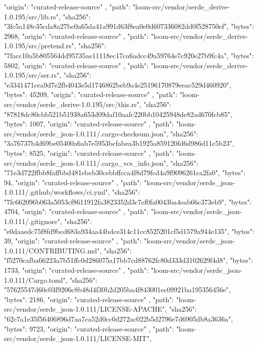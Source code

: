 {{      "origin": "curated-release-source"
    },
    {
      "path": "loom-src/vendor/serde_derive-1.0.195/src/lib.rs",
      "sha256": "3fc5a148c35cda8a27bc0a65da41a991d63f8ea0e0d607336082dd0f528750ef",
      "bytes": 2968,
      "origin": "curated-release-source"
    },
    {
      "path": "loom-src/vendor/serde_derive-1.0.195/src/pretend.rs",
      "sha256": "7facc10a5b805564dd95735ae11118ec17ca6adcc49a59764e7c920e27b9fc4a",
      "bytes": 5802,
      "origin": "curated-release-source"
    },
    {
      "path": "loom-src/vendor/serde_derive-1.0.195/src/ser.rs",
      "sha256": "e3341471cea9d7e2fb4043e5d1746862beb9a4e25196170879eeac529d460920",
      "bytes": 45209,
      "origin": "curated-release-source"
    },
    {
      "path": "loom-src/vendor/serde_derive-1.0.195/src/this.rs",
      "sha256": "87818dc80cbb521b51938a653d09daf10aafc220bb10425948de82ad670fcb85",
      "bytes": 1007,
      "origin": "curated-release-source"
    },
    {
      "path": "loom-src/vendor/serde_json-1.0.111/.cargo-checksum.json",
      "sha256": "3a76737b4d69be05400a6ab7e5953bcfabea3b1925a859120fd6d986d11c5b23",
      "bytes": 8525,
      "origin": "curated-release-source"
    },
    {
      "path": "loom-src/vendor/serde_json-1.0.111/.cargo_vcs_info.json",
      "sha256": "71e3d722ffbb8faffbbd481ebeb30cebbffcca4f8d79fcd4a9f9096261ca2fa0",
      "bytes": 94,
      "origin": "curated-release-source"
    },
    {
      "path": "loom-src/vendor/serde_json-1.0.111/.github/workflows/ci.yml",
      "sha256": "7fc662096b063a5053cf8611912fa3823352d3c7ef0fa0043ba4eab66c373eb9",
      "bytes": 4704,
      "origin": "curated-release-source"
    },
    {
      "path": "loom-src/vendor/serde_json-1.0.111/.gitignore",
      "sha256": "e0daaedc75f8fd9bcd683a934aa44bdce314c11cc8525201cf5d1579a944e135",
      "bytes": 39,
      "origin": "curated-release-source"
    },
    {
      "path": "loom-src/vendor/serde_json-1.0.111/CONTRIBUTING.md",
      "sha256": "f5270cafba66223a7b51ffc0d286075a17bb7cd88762fc80d333d3102629f4d8",
      "bytes": 1733,
      "origin": "curated-release-source"
    },
    {
      "path": "loom-src/vendor/serde_json-1.0.111/Cargo.toml",
      "sha256": "57625547d60c03f9206c8b48d4f30b2d205ba4f843001ec09921ba195356456e",
      "bytes": 2186,
      "origin": "curated-release-source"
    },
    {
      "path": "loom-src/vendor/serde_json-1.0.111/LICENSE-APACHE",
      "sha256": "62c7a1e35f56406896d7aa7ca52d0cc0d272ac022b5d2796e7d6905db8a3636a",
      "bytes": 9723,
      "origin": "curated-release-source"
    },
    {
      "path": "loom-src/vendor/serde_json-1.0.111/LICENSE-MIT",
}}
